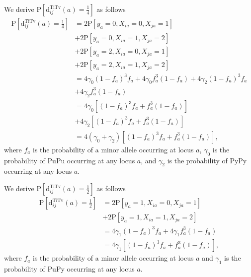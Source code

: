 \documentclass[aoas]{imsart}
\begin{document}
We derive $\text{P}\left[\text{d}^\text{TiTv}_{ij}(a) = \frac{1}{4}\right]$ as follows
%
\begin{equation}\label{eq:prob_TiTv_0.25}
\begin{aligned}
\text{P}\left[\text{d}^\text{TiTv}_{ij}(a) = \frac{1}{4}\right] &= 2 \text{P}\left[y_a = 0, X_{ia} = 0, X_{ja} = 1\right] \\
&+ 2 \text{P}\left[y_a = 0, X_{ia} = 1, X_{ja} = 2\right] \\
&+ 2 \text{P}\left[y_a = 2, X_{ia} = 0, X_{ja} = 1\right] \\
&+ 2 \text{P}\left[y_a = 2, X_{ia} = 1, X_{ja} = 2\right] \\
&= 4 \gamma_0 (1 - f_a)^3 f_a + 4 \gamma_0 f^3_a (1 - f_a) + 4 \gamma_2 (1 - f_a)^3 f_a \\
&+ 4 \gamma_2 f^3_a (1 - f_a) \\
&= 4 \gamma_0 \left[(1 - f_a)^3 f_a + f^3_a (1 - f_a)\right] \\
&+ 4 \gamma_2 \left[(1 - f_a)^3 f_a + f^3_a (1 - f_a)\right] \\
&= 4(\gamma_0 + \gamma_2)\left[(1 - f_a)^3 f_a + f^3_a (1 - f_a)\right],
\end{aligned}
\end{equation}
%
where $f_a$ is the probability of a minor allele occurring at locus $a$, $\gamma_0$ is the probability of PuPu occurring at any locus $a$,  and $\gamma_2$ is the probability of PyPy occurring at any locus $a$.

We derive $\text{P}\left[\text{d}^\text{TiTv}_{ij}(a) = \frac{1}{2}\right]$ as follows
%
\begin{equation}\label{eq:prob_TiTv_0.5}
\begin{aligned}
\text{P}\left[\text{d}^\text{TiTv}_{ij}(a) = \frac{1}{2}\right] &= 2 \text{P}\left[y_a = 1, X_{ia} = 0, X_{ja} = 1\right] \\
&+ 2 \text{P}\left[y_a = 1, X_{ia} = 1, X_{ja} = 2\right] \\
&= 4 \gamma_1 (1 - f_a)^3 f_a + 4 \gamma_1 f^3_a (1 - f_a) \\
&= 4 \gamma_1 \left[(1 - f_a)^3 f_a + f^3_a (1 - f_a)\right],
\end{aligned}
\end{equation}
%
where $f_a$ is the probability of a minor allele occurring at locus $a$ and $\gamma_1$ is the probability of PuPy occurring at any locus $a$.
\end{document}

